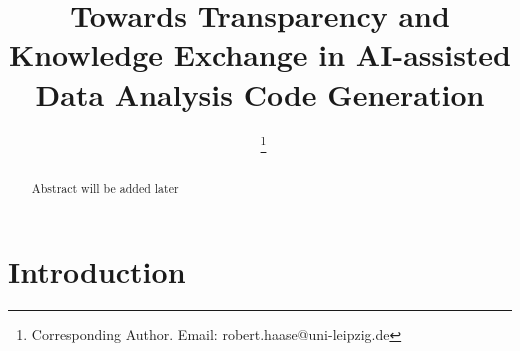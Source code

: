 \documentclass{ecai}
\begin{document}

\begin{frontmatter}




\title{Towards Transparency and Knowledge Exchange in AI-assisted Data Analysis Code Generation}


\author[A,B]{~\thanks{Corresponding Author. Email: robert.haase@uni-leipzig.de}}

\address[A]{Data Science Center, Leipzig University, Humboldtstra{\ss}e 25, 04105 Leipzig, Germany}
\address[B]{Center for Scalable Data Analytics and Artificial Intelligence (ScaDS.AI) Dresden / Leipzig}


\begin{abstract}

Abstract will be added later

\end{abstract}

\end{frontmatter}


\section{Introduction}
\end{document}
